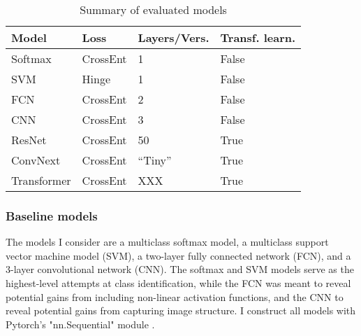 \documentclass[10pt,twocolumn,letterpaper]{article}
\begin{document}
\begin{table}[!htbp]
  \begin{center}
    \small
  \begin{tabular}{|l|l|l|l|}
  \hline
  Model & Loss & Layers/Vers. & Transf. learn.\\
  \hline\hline
  Softmax & CrossEnt & 1 & False \\
  SVM & Hinge & 1 & False \\
  FCN & CrossEnt & 2 & False \\
  CNN & CrossEnt & 3 & False \\
  ResNet & CrossEnt & 50 & True \\
  ConvNext & CrossEnt & ``Tiny'' & True \\
  Transformer & CrossEnt & XXX & True \\
  \hline
  \end{tabular}
  \end{center}
  \caption{\label{tab:model_desc} Summary of evaluated models}
  \end{table}

\subsubsection{Baseline models}
The models I consider are a multiclass softmax model, a multiclass support vector machine model (SVM), a two-layer fully connected network (FCN), and a 3-layer convolutional network (CNN). The softmax and SVM models serve as the highest-level attempts at class identification, while the FCN was meant to reveal potential gains from including non-linear activation functions, and the CNN to reveal potential gains from capturing image structure. I construct all models with Pytorch's "nn.Sequential" module \cite{PyTorch}.
\end{document}
